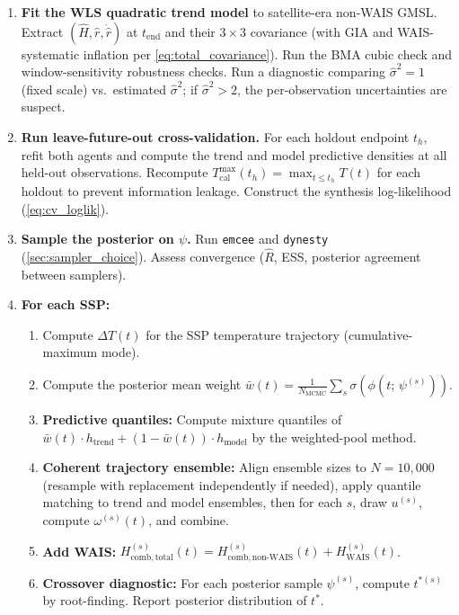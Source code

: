 \documentclass[11pt]{article}
\newcommand{\dT}{\Delta T}
\newcommand{\tcal}{T_{\mathrm{cal}}^{\max}}
\newcommand{\tend}{t_{\mathrm{end}}}
\begin{document}
\begin{enumerate}
  \item \textbf{Fit the WLS quadratic trend model} to satellite-era non-WAIS GMSL.  Extract $(\hat{H}, \hat{r}, \dot{\hat{r}})$ at $\tend$ and their $3 \times 3$ covariance (with GIA and WAIS-systematic inflation per \cref{eq:total_covariance}).  Run the BMA cubic check and window-sensitivity robustness checks.  Run a diagnostic comparing $\hat{\sigma}^2 = 1$ (fixed scale) vs.\ estimated $\hat{\sigma}^2$; if $\hat{\sigma}^2 > 2$, the per-observation uncertainties are suspect.
  \item \textbf{Run leave-future-out cross-validation.}  For each holdout endpoint $t_h$, refit both agents and compute the trend and model predictive densities at all held-out observations.  Recompute $\tcal(t_h) = \max_{t \le t_h} T(t)$ for each holdout to prevent information leakage.  Construct the synthesis log-likelihood (\cref{eq:cv_loglik}).
  \item \textbf{Sample the posterior on $\psi$.}  Run \texttt{emcee} and \texttt{dynesty} (\cref{sec:sampler_choice}).  Assess convergence ($\hat{R}$, ESS, posterior agreement between samplers).
  \item \textbf{For each SSP:}
  \begin{enumerate}
    \item Compute $\dT(t)$ for the SSP temperature trajectory (cumulative-maximum mode).
    \item Compute the posterior mean weight $\bar{w}(t) = \frac{1}{N_{\mathrm{MCMC}}} \sum_s \sigma(\phi(t;\,\psi^{(s)}))$.
    \item \textbf{Predictive quantiles:} Compute mixture quantiles of $\bar{w}(t) \cdot h_{\mathrm{trend}} + (1 - \bar{w}(t)) \cdot h_{\mathrm{model}}$ by the weighted-pool method.
    \item \textbf{Coherent trajectory ensemble:} Align ensemble sizes to $N = 10{,}000$ (resample with replacement independently if needed), apply quantile matching to trend and model ensembles, then for each $s$, draw $u^{(s)}$, compute $\omega^{(s)}(t)$, and combine.
    \item \textbf{Add WAIS:} $H_{\mathrm{comb,total}}^{(s)}(t) = H_{\mathrm{comb,non\text{-}WAIS}}^{(s)}(t) + H_{\mathrm{WAIS}}^{(s)}(t)$.
    \item \textbf{Crossover diagnostic:} For each posterior sample $\psi^{(s)}$, compute $t^{*(s)}$ by root-finding.  Report posterior distribution of $t^*$.
  \end{enumerate}
\end{enumerate}
\end{document}
